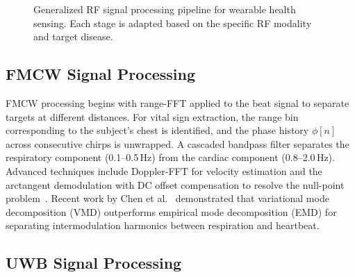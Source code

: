 \documentclass[journal,twoside]{IEEEtran}
\begin{document}
\begin{figure}[!t]
\caption{Generalized RF signal processing pipeline for wearable health sensing. Each stage is adapted based on the specific RF modality and target disease.}
\label{fig:pipeline}
\end{figure}

\subsection{FMCW Signal Processing}

FMCW processing begins with range-FFT applied to the beat signal to separate targets at different distances. For vital sign extraction, the range bin corresponding to the subject's chest is identified, and the phase history $\phi[n]$ across consecutive chirps is unwrapped. A cascaded bandpass filter separates the respiratory component (0.1--0.5\,Hz) from the cardiac component (0.8--2.0\,Hz). Advanced techniques include Doppler-FFT for velocity estimation and the arctangent demodulation with DC offset compensation to resolve the null-point problem~\cite{ref_fmcw_contactless2025}. Recent work by Chen et al.~\cite{ref_highprecision2024} demonstrated that variational mode decomposition (VMD) outperforms empirical mode decomposition (EMD) for separating intermodulation harmonics between respiration and heartbeat.

\subsection{UWB Signal Processing}
\end{document}
